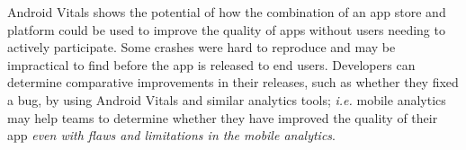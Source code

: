 Android Vitals shows the potential of how the combination of an app store and platform could be used to improve the quality of apps without users needing to actively participate. Some crashes were hard to reproduce and may be impractical to find before the app is released to end users. Developers can determine comparative improvements in their releases, such as whether they fixed a bug, by using Android Vitals and similar analytics tools; \emph{i.e.} mobile analytics may help teams to determine whether they have improved the quality of their app \emph{even with flaws and limitations in the mobile analytics}.




